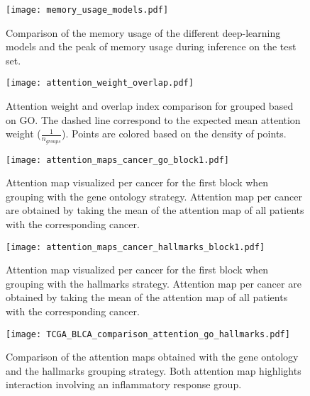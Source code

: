 \begin{figure}[htbp]
	\centering
	\texttt{[image: memory\_usage\_models.pdf]}
	\caption{Comparison of the memory usage of the different deep-learning models and the peak of memory usage during inference on the test set.}
	\label{fig:mem_uasge}
\end{figure}



\begin{figure}[htbp]
	\centering
	\texttt{[image: attention\_weight\_overlap.pdf]}
	\caption{Attention weight and overlap index comparison for grouped based on GO\@. The dashed line correspond to the expected mean attention weight (\(\frac{1}{n_{groups}} \)). Points are colored based on the density of points.}
	\label{fig:att_w_overlap}
\end{figure}

\begin{landscape}
	\begin{figure}[p]
		\centering
		\texttt{[image: attention\_maps\_cancer\_go\_block1.pdf]}
		\caption{Attention map visualized per cancer for the first block when grouping with the gene ontology strategy. Attention map per cancer are obtained by taking the mean of the attention map of all patients with the corresponding cancer. }
		\label{fig:att_map_cancer_go}
	\end{figure}

	\begin{figure}[p]
		\centering
		\texttt{[image: attention\_maps\_cancer\_hallmarks\_block1.pdf]}
		\caption{Attention map visualized per cancer for the first block when grouping with the hallmarks strategy. Attention map per cancer are obtained by taking the mean of the attention map of all patients with the corresponding cancer. }
		\label{fig:att_map_cancer_hallmarks}
	\end{figure}

	\begin{figure}[p]
		\centering
		\texttt{[image: TCGA\_BLCA\_comparison\_attention\_go\_hallmarks.pdf]}
		\caption{Comparison of the attention maps obtained with the gene ontology and the hallmarks grouping strategy. Both attention map highlights interaction involving an inflammatory response group. }
		\label{fig:att_map_blca_comp}
	\end{figure}
\end{landscape}
